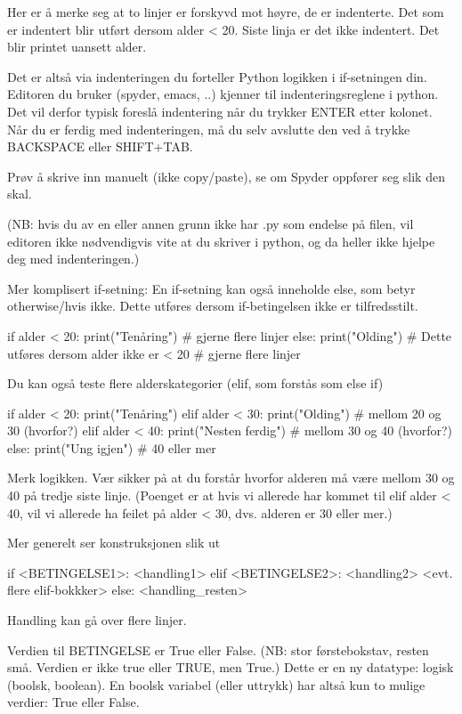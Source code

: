Her er å merke seg at to linjer er forskyvd mot høyre, de er indenterte.
Det som er indentert blir utført dersom alder < 20. 
Siste linja er det ikke indentert. Det blir printet uansett alder.

Det er altså via indenteringen du forteller Python logikken i if-setningen din.
Editoren du bruker (spyder, emacs, ..) kjenner til indenteringsreglene i python.
Det vil derfor typisk foreslå indentering når du trykker ENTER etter kolonet.
Når du er ferdig med indenteringen, må du selv avslutte den ved å trykke
BACKSPACE eller SHIFT+TAB. 

Prøv å skrive inn manuelt (ikke copy/paste), se om Spyder oppfører seg slik den skal. 

(NB: hvis du av en eller annen grunn ikke har .py som endelse på filen,
vil editoren ikke nødvendigvis vite at du skriver i python,
og da heller ikke hjelpe deg med indenteringen.) 


Mer komplisert if-setning: 
En if-setning kan også inneholde else, som betyr otherwise/hvis ikke.
Dette utføres dersom if-betingelsen ikke er tilfredsstilt. 

if alder < 20: 
   print("Tenåring")
   # gjerne flere linjer
else: 
   print("Olding")     # Dette utføres dersom alder ikke er < 20
   # gjerne flere linjer

Du kan også teste flere alderskategorier (elif, som forstås som else if) 

if alder < 20: 
   print("Tenåring")
elif alder < 30:           
   print("Olding")         # mellom 20 og 30 (hvorfor?) 
elif alder < 40: 
   print("Nesten ferdig")  # mellom 30 og 40 (hvorfor?)
else: 
   print("Ung igjen")  # 40 eller mer 

Merk logikken.
Vær sikker på at du forstår hvorfor alderen må være mellom 30 og 40
på tredje siste linje.
(Poenget er at hvis vi allerede har kommet til elif alder < 40, vil vi allerede
ha feilet på alder < 30, dvs. alderen er 30 eller mer.) 


Mer generelt ser konstruksjonen slik ut

if <BETINGELSE1>: 
   <handling1>
elif <BETINGELSE2>: 
   <handling2>
<evt. flere elif-bokkker>
else: 
   <handling_resten>


Handling kan gå over flere linjer. 


Verdien til BETINGELSE er True eller False.
(NB: stor førstebokstav, resten små. Verdien er ikke true eller TRUE, men True.)
Dette er en ny datatype: logisk (boolsk, boolean).
En boolsk variabel (eller uttrykk) har altså kun to mulige verdier: True eller False. 

